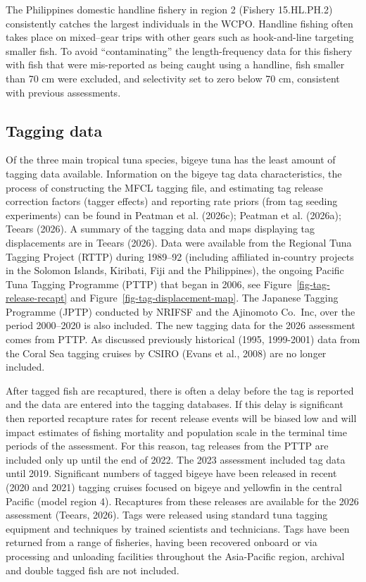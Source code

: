 \documentclass[
  english,
  a4paper,
  a4paper,
  11pt]{SCreport}
\begin{document}
The Philippines domestic handline fishery in region 2 (Fishery
15.HL.PH.2) consistently catches the largest individuals in the WCPO.
Handline fishing often takes place on mixed--gear trips with other gears
such as hook-and-line targeting smaller fish. To avoid ``contaminating''
the length-frequency data for this fishery with fish that were
mis-reported as being caught using a handline, fish smaller than 70 cm
were excluded, and selectivity set to zero below 70 cm, consistent with
previous assessments.

\subsection{Tagging data}\label{sec-tag-data}

Of the three main tropical tuna species, bigeye tuna has the least
amount of tagging data available. Information on the bigeye tag data
characteristics, the process of constructing the MFCL tagging file, and
estimating tag release correction factors (tagger effects) and reporting
rate priors (from tag seeding experiments) can be found in Peatman et
al. (2026c); Peatman et al. (2026a); Teears (2026). A summary of the
tagging data and maps displaying tag displacements are in Teears (2026).
Data were available from the Regional Tuna Tagging Project (RTTP) during
1989--92 (including affiliated in-country projects in the Solomon
Islands, Kiribati, Fiji and the Philippines), the ongoing Pacific Tuna
Tagging Programme (PTTP) that began in 2006, see
Figure~\ref{fig-tag-release-recapt} and
Figure~\ref{fig-tag-displacement-map}. The Japanese Tagging Programme
(JPTP) conducted by NRIFSF and the Ajinomoto Co.~Inc, over the period
2000--2020 is also included. The new tagging data for the 2026
assessment comes from PTTP. As discussed previously historical (1995,
1999-2001) data from the Coral Sea tagging cruises by CSIRO (Evans et
al., 2008) are no longer included.

After tagged fish are recaptured, there is often a delay before the tag
is reported and the data are entered into the tagging databases. If this
delay is significant then reported recapture rates for recent release
events will be biased low and will impact estimates of fishing mortality
and population scale in the terminal time periods of the assessment. For
this reason, tag releases from the PTTP are included only up until the
end of 2022. The 2023 assessment included tag data until 2019.
Significant numbers of tagged bigeye have been released in recent (2020
and 2021) tagging cruises focused on bigeye and yellowfin in the central
Pacific (model region 4). Recaptures from these releases are available
for the 2026 assessment (Teears, 2026). Tags were released using
standard tuna tagging equipment and techniques by trained scientists and
technicians. Tags have been returned from a range of fisheries, having
been recovered onboard or via processing and unloading facilities
throughout the Asia-Pacific region, archival and double tagged fish are
not included.
\end{document}
